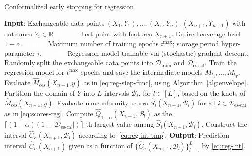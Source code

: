 \begin{algorithm}[H]
    \caption{Conformalized early stopping for regression}
    \label{alg:reg}
    \begin{algorithmic}[1]
        \STATE \textbf{Input}: Exchangeable data points $(X_{1},Y_{1}), \ldots, (X_{n},Y_{n}), (X_{n+1},Y_{n+1})$ with outcomes $Y_i \in \mathbb{R}$.
        \STATE \textcolor{white}{\textbf{Input}:} Test point with features $X_{n+1}$. Desired coverage level $1-\alpha$.
        \STATE \textcolor{white}{\textbf{Input}:} Maximum number of training epochs $t^{\max}$; storage period hyper-parameter $\tau$.
        \STATE \textcolor{white}{\textbf{Input}:} Regression model trainable via (stochastic) gradient descent.
        \STATE Randomly split the exchangeable data points into $\mathcal{D}_{\text{train}}$ and $\mathcal{D}_{\text{es-cal}}$.
        \STATE Train the regression model for $t^{\text{max}}$ epochs and save the intermediate models $M_{t_1} , \dots, M_{t_T}$.
        \STATE Evaluate $\hat{M}_{\text{ces}}(X_{n+1},y)$ as in \eqref{eq:reg-step-func}, using Algorithm~\ref{alg:envelope}.
        \STATE Partition the domain of $Y$ into $L$ intervals $\mathcal{B}_l$, for $l \in [L]$, based on the knots of $\hat{M}_{\text{ces}}(X_{n+1},y)$.
        \STATE Evaluate nonconformity scores $\hat{S}_i(X_{n+1},\mathcal{B}_l)$ for all $i \in \mathcal{D}_{\text{es-cal}}$ as in \eqref{eq:scores-reg}.
        \STATE Compute $\hat{Q}_{1-\alpha}(X_{n+1},\mathcal{B}_l)$ as the $\lceil (1-\alpha)(1+|\mathcal{D}_{\text{es-cal}}|) \rceil$-th largest value among $\hat{S}_i(X_{n+1},\mathcal{B}_l)$.
 \STATE Construct the interval $\hat{C}_{\alpha}(X_{n+1}, \mathcal{B}_l)$ according to~\eqref{eq:reg-int-tmp}.
        \ENDFOR
        \STATE \textbf{Output}: Prediction interval $\hat{C}_{\alpha}(X_{n+1})$ given as a function of $\{\hat{C}_{\alpha}(X_{n+1}, \mathcal{B}_l)\}_{l=1}^{L}$ by \eqref{eq:reg-int}.
    \end{algorithmic}
\end{algorithm}




